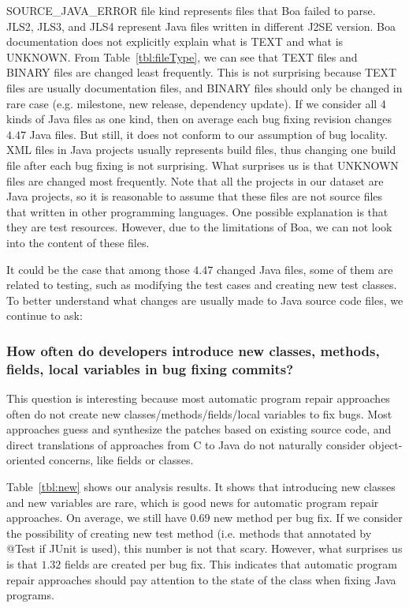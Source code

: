 \documentclass{sig-alternate-05-2015}
\begin{document}
SOURCE\_JAVA\_ERROR file kind represents files that Boa failed to parse. JLS2,
JLS3, and JLS4 represent Java files written in different J2SE version. Boa
documentation does not explicitly explain what is TEXT and what is UNKNOWN. From
Table~\ref{tbl:fileType}, we can see that TEXT files and BINARY files are
changed least frequently. This is not surprising because TEXT files are usually
documentation files, and BINARY files should only be changed in rare case (e.g.
milestone, new release, dependency update). If we consider all 4 kinds of Java
files as one kind, then on average each bug fixing revision changes $4.47$ Java
files. But still, it does not conform to our assumption of bug locality. XML
files in Java projects usually represents build files, thus changing one build
file after each bug fixing is not surprising.  What surprises us is that UNKNOWN
files are changed most frequently. Note that all the projects in our dataset are
Java projects, so it is reasonable to assume that these files are not source
files that written in other programming languages.  One possible explanation is
that they are test resources. However, due to the limitations of Boa, we can not
look into the content of these files. 

It could be the case that among those $4.47$ changed Java files, some of them
are related to testing, such as modifying the test cases and creating new test
classes. To better understand what changes are usually made to Java source code
files, we continue to ask:

\subsubsection*{How often do developers introduce new classes, methods, fields,
	local variables in
bug fixing commits?} \vspace{-0.3em}

This question is interesting because most automatic program repair approaches
often do not create new classes/methods/fields/local variables to fix bugs.
Most approaches guess and synthesize the patches based on existing source code,
and direct translations of approaches from C to Java do not naturally consider
object-oriented concerns, like fields or classes. 

Table~\ref{tbl:new} shows our analysis results. It shows that introducing new
classes and new variables are rare, which is good news for automatic program
repair approaches. On average, we still have $0.69$ new method per bug fix. If
we consider the possibility of creating new test method (i.e.  methods that
annotated by @Test if JUnit is used), this number is not that scary. However,
what surprises us is that $1.32$ fields are created per bug fix.  This indicates
that automatic program repair approaches should pay attention to the state of
the class when fixing Java programs.
\end{document}
